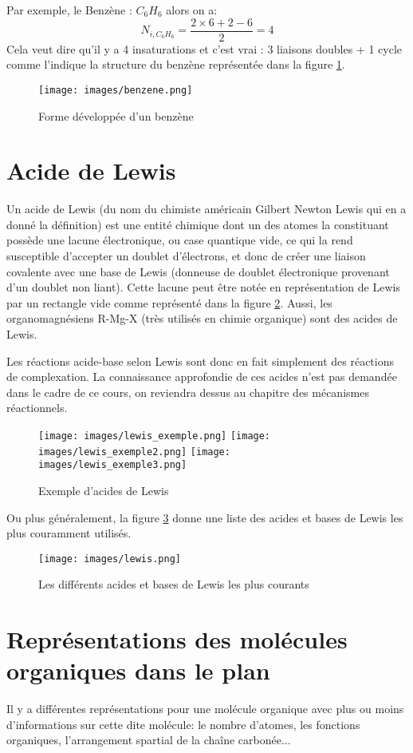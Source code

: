 Par exemple, le Benzène : $C_6H_6$ alors on a:
\begin{equation}
    N_{i,C_6H_6}=\frac{2\times6+2-6}{2}=4
\end{equation}
Cela veut dire qu'il y a 4 insaturations et c'est vrai : 3 liaisons doubles + 1 cycle comme l'indique la structure du benzène représentée dans la figure \ref{fig:benzene_dev}. 
\begin{figure}[htbp]
    \centering
    \texttt{[image: images/benzene.png]}
    \caption{Forme développée d'un benzène}
    \label{fig:benzene_dev}
\end{figure}
\section{Acide de Lewis}
Un acide de Lewis (du nom du chimiste américain Gilbert Newton Lewis qui en a donné la définition) est une entité chimique dont un des atomes la constituant possède une lacune électronique, ou case quantique vide, ce qui la rend susceptible d'accepter un doublet d'électrons, et donc de créer une liaison covalente avec une base de Lewis (donneuse de doublet électronique provenant d'un doublet non liant). Cette lacune peut être notée en représentation de Lewis par un rectangle vide comme représenté dans la figure \ref{fig:lexis_example}. Aussi, les organomagnésiens R-Mg-X (très utilisés en chimie organique) sont des acides de Lewis.

Les réactions acide-base selon Lewis sont donc en fait simplement des réactions de complexation. La connaissance approfondie de ces acides n'est pas demandée dans le cadre de ce cours, on reviendra dessus au chapitre des mécanismes réactionnels.

\begin{figure}[htbp]
    \centering
    \texttt{[image: images/lewis\_exemple.png]}
    \texttt{[image: images/lewis\_exemple2.png]}
    \texttt{[image: images/lewis\_exemple3.png]}
    \caption{Exemple d'acides de Lewis}
    \label{fig:lexis_example}
\end{figure}

Ou plus généralement, la figure \ref{fig:lewis_list} donne une liste des acides et bases de Lewis les plus couramment utilisés. 
\begin{figure}[htbp]
    \centering
    \texttt{[image: images/lewis.png]} 
    \caption{Les différents acides et bases de Lewis les plus courants}
    \label{fig:lewis_list}
\end{figure}
\section{Représentations des molécules organiques dans le plan}
Il y a différentes représentations pour une molécule organique avec plus ou moins d'informations sur cette dite molécule: le nombre d'atomes, les fonctions organiques, l'arrangement spartial de la chaîne carbonée...

